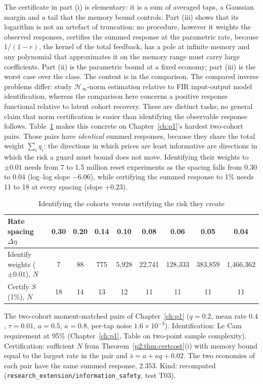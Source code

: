 The certificate in part (i) is elementary: it is a sum of averaged taps, a Gaussian margin and a tail that the memory bound controls. Part (iii) shows that its logarithm is not an artefact of truncation: no procedure, however it weights the observed responses, certifies the summed response at the parametric rate, because $1/(1-r)$, the kernel of the total feedback, has a pole at infinite memory and any polynomial that approximates it on the memory range must carry large coefficients. Part (ii) is the parametric bound at a fixed economy; part (iii) is the worst case over the class. The content is in the comparison. The compared inverse problems differ: \citet{p2:tu2018} study $\mathcal H_\infty$-norm estimation relative to FIR input-output model identification, whereas the comparison here concerns a positive response functional relative to latent cohort recovery. These are distinct tasks; no general claim that norm certification is easier than identifying the observable response follows. Table~\ref{p2:tab:certvsid} makes this concrete on Chapter~\ref{ch:p1}'s hardest two-cohort pairs. Those pairs have \emph{identical} summed responses, because they share the total weight $\sum_iq_i$: the directions in which prices are least informative are directions in which the risk a guard must bound does not move. Identifying their weights to $\pm0.01$ needs from 7 to 1.5 million reset experiments as the spacing falls from $0.30$ to $0.04$ (log--log slope $-6.06$), while certifying the summed response to 1\% needs 11 to 18 at every spacing (slope $+0.23$).

\begin{table}[t]\centering\small
\begin{threeparttable}
\caption{Identifying the cohorts versus certifying the risk they create}\label{p2:tab:certvsid}
\begin{tabular}{lcccccccc}
\toprule
Rate spacing $\Delta\eta$ & 0.30 & 0.20 & 0.14 & 0.10 & 0.08 & 0.06 & 0.05 & 0.04\\
\midrule
Identify weights ($\pm0.01$), $N$ & 7 & 88 & 775 & 5{,}928 & 22{,}741 & 128{,}333 & 383{,}859 & 1{,}466{,}362\\
Certify $S$ (1\%), $N$ & 18 & 14 & 13 & 12 & 11 & 11 & 11 & 11\\
\bottomrule
\end{tabular}
\begin{tablenotes}\footnotesize\item The two-cohort moment-matched pairs of Chapter~\ref{ch:p1} ($q=0.2$, mean rate $0.4$, $\tau=0.01$, $a=0.5$, $\kappa=0.8$, per-tap noise $1.6\times10^{-3}$). Identification: Le Cam requirement at 95\% (Chapter~\ref{ch:p1}, Table on two-point sample complexity). Certification: sufficient $N$ from Theorem~\ref{p2:thm:certcost}(i) with memory bound equal to the largest rate in the pair and $\bar s=a+\kappa q+0.02$. The two economies of each pair have the same summed response, $2.353$. Kind: recomputed (\texttt{research\_extension/information\_safety}, test T03).\end{tablenotes}
\end{threeparttable}
\end{table}

